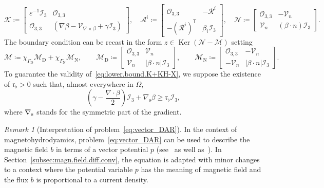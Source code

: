 \documentclass[11pt,a4paper]{article}
\theoremstyle{plain}
\theoremstyle{remark}
\newtheorem{remark}[theorem]{Remark}
\theoremstyle{definition}
\newcommand{\Id}[1]{\mathcal{I}_{#1}}
\newcommand{\trans}{\mathsf{T}}
\DeclareMathOperator{\Ker}{Ker}
\newcommand{\dirichlet}{\mathrm{D}}
\newcommand{\neumann}{\mathrm{N}}
\newcommand{\Kmin}{\mathfrak{r}_\flat}
\newcommand{\symm}{\mathrm{s}}
\begin{document}
\begin{equation}\label{eq:vector_DAR.as.fried}
  \mathcal{K} \coloneqq
  \begin{bmatrix}
    \varepsilon^{-1} \Id{3} & \mathcal{O}_{3,3} \\
    \mathcal{O}_{3,3} & (\nabla \beta - \mathcal{V}_{\nabla\times\beta} +\gamma\Id{3})
  \end{bmatrix},
  \quad
  \mathcal{A}^i \coloneqq
  \begin{bmatrix}
    \mathcal{O}_{3,3} & -\mathcal{R}^i\\
    -(\mathcal{R}^i)^\trans & \beta_i\Id{3}
  \end{bmatrix},
  \quad
  \mathcal{N} \coloneqq
  \begin{bmatrix}
    \mathcal{O}_{3,3} & -\mathcal{V}_n \\
    \mathcal{V}_n & (\beta\cdot n) \Id{3}
  \end{bmatrix}.
\end{equation}
The boundary condition can be recast in the form $z\in\Ker(\mathcal{N}-\mathcal{M})$ setting
\[
\mathcal{M} \coloneqq \chi_{\Gamma_\dirichlet} \mathcal{M}_\dirichlet + \chi_{\Gamma_\neumann} \mathcal{M}_\neumann,
\qquad
\mathcal{M}_\dirichlet \coloneqq
\begin{bmatrix}
  \mathcal{O}_{3,3} & \mathcal{V}_n\\
  \mathcal{V}_n & |\beta\cdot n|\Id{3}
\end{bmatrix},
\qquad
\mathcal{M}_\neumann \coloneqq
\begin{bmatrix}
  \mathcal{O}_{3,3} & -\mathcal{V}_n\\
  -\mathcal{V}_n & |\beta\cdot n|\Id{3}
\end{bmatrix}.
\]
To guarantee the validity of~\eqref{eq:lower.bound.K+KH-X},
we suppose the existence of $\Kmin > 0$ such that, almost everywhere in $\Omega$,
\[
\left(
\gamma - \frac{\nabla\cdot\beta}{2}
\right)\Id{3} + \nabla_\symm \beta \ge \Kmin \Id{3},
\]
where $\nabla_{\rm s}$ stands for the symmetric part of the gradient.

\begin{remark}[Interpretation of problem~\eqref{eq:vector_DAR}]
  In the context of magnetohydrodyamics, problem~\eqref{eq:vector_DAR} can be used to describe the magnetic field $b$ in terms of a vector potential $p$ (see~\cite[Section~5]{Heumann.Hiptmair:11} as well as~\cite{Heumann.Hiptmair:13}).
  In Section~\ref{subsec:magn.field.diff.conv}, the equation is adapted with minor changes to a context where the potential variable $p$ has the meaning of magnetic field and the flux $b$ is proportional to a current density.
\end{remark}
\end{document}
